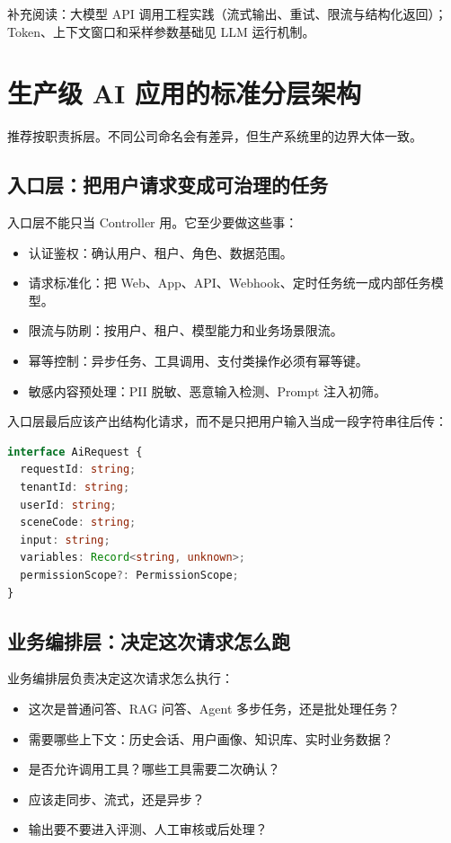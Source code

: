 \documentclass[9pt,a4paper,twocolumn]{ctexart}
\begin{document}
补充阅读：大模型 API 调用工程实践（流式输出、重试、限流与结构化返回）；Token、上下文窗口和采样参数基础见 LLM 运行机制。



\section*{生产级 AI 应用的标准分层架构}


推荐按职责拆层。不同公司命名会有差异，但生产系统里的边界大体一致。



\subsection*{入口层：把用户请求变成可治理的任务}


入口层不能只当 Controller 用。它至少要做这些事：


\begin{itemize}[itemsep=1pt, topsep=2pt]
  \item 认证鉴权：确认用户、租户、角色、数据范围。
  \item 请求标准化：把 Web、App、API、Webhook、定时任务统一成内部任务模型。
  \item 限流与防刷：按用户、租户、模型能力和业务场景限流。
  \item 幂等控制：异步任务、工具调用、支付类操作必须有幂等键。
  \item 敏感内容预处理：PII 脱敏、恶意输入检测、Prompt 注入初筛。
\end{itemize}


入口层最后应该产出结构化请求，而不是只把用户输入当成一段字符串往后传：



\begin{lstlisting}[language=TypeScript]
interface AiRequest {
  requestId: string;
  tenantId: string;
  userId: string;
  sceneCode: string;
  input: string;
  variables: Record<string, unknown>;
  permissionScope?: PermissionScope;
}
\end{lstlisting}



\subsection*{业务编排层：决定这次请求怎么跑}


业务编排层负责决定这次请求怎么执行：


\begin{itemize}[itemsep=1pt, topsep=2pt]
  \item 这次是普通问答、RAG 问答、Agent 多步任务，还是批处理任务？
  \item 需要哪些上下文：历史会话、用户画像、知识库、实时业务数据？
  \item 是否允许调用工具？哪些工具需要二次确认？
  \item 应该走同步、流式，还是异步？
  \item 输出要不要进入评测、人工审核或后处理？
\end{itemize}
\end{document}
